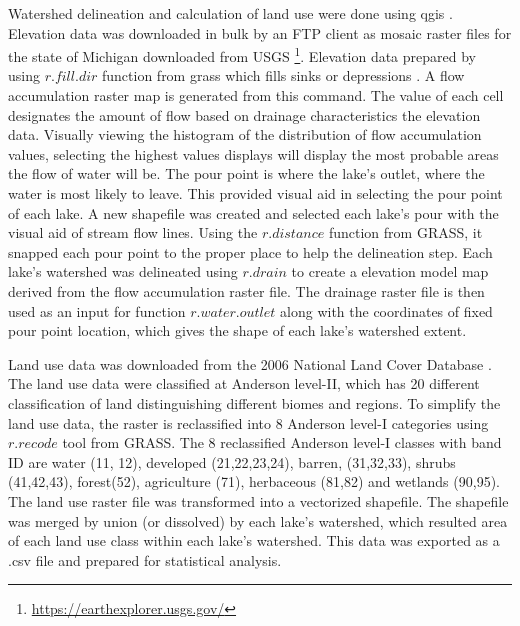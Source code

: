 Watershed delineation and calculation of land use were done using \gls{qgis} \cite{qgis_development_team_qgis_2009}.
Elevation data was downloaded in bulk by an FTP client as mosaic raster files for the state of Michigan downloaded from USGS \footnote{\url{https://earthexplorer.usgs.gov/}}.
Elevation data  prepared by using $r.fill.dir$ function from \gls{grass} which fills sinks or depressions \cite{grass_development_team_geographic_2017}. A flow accumulation raster map is generated from this command. The value of each cell designates the amount of flow based on drainage characteristics the elevation data. Visually viewing the histogram of the distribution of flow accumulation values, selecting the highest values displays will display the most probable areas the flow of water will be. The pour point is where the lake's outlet, where the water is most likely to leave. This provided visual aid in selecting the pour point of each lake. A new shapefile was created and selected each lake's pour with the visual aid of stream flow lines. Using the $r.distance$ function from GRASS, it snapped each pour point to the proper place to help the delineation step. Each lake's watershed was delineated using $r.drain$ to create a elevation model map derived from the flow accumulation raster file. The drainage raster file is then used as an input for function $r.water.outlet$ along with the coordinates of fixed pour point location, which gives the shape of each lake's watershed extent.

Land use data was downloaded from the 2006 National Land Cover Database \cite{homer_development_2004}. The land use data were classified at Anderson level-II, which has 20 different classification of land distinguishing different biomes and regions.  To simplify the land use data, the raster is reclassified into 8 Anderson level-I categories using $r.recode$ tool from GRASS. The 8 reclassified Anderson level-I classes with band ID are water (11, 12), developed (21,22,23,24), barren, (31,32,33), shrubs (41,42,43), forest(52), agriculture (71), herbaceous (81,82) and wetlands (90,95). The land use raster file was transformed into a vectorized shapefile. The shapefile was merged by union (or dissolved) by each lake's watershed, which resulted area of each land use class within each lake's watershed. This data was exported as a .csv file and prepared for statistical analysis.

